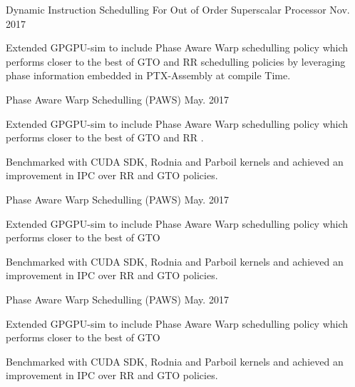 \begin{cvprojects}
    \cvproject
    {Dynamic Instruction Schedulling For Out of Order Superscalar Processor }
    {\color{darkgray}Nov. 2017}
    {
      \begin{cvprojectitems}
        \item {Extended GPGPU-sim to include Phase Aware Warp schedulling policy which performs closer to the best of GTO and RR schedulling policies by leveraging phase information embedded in PTX-Assembly at compile Time.}
      \end{cvprojectitems}
    }

    \cvproject
    {Phase Aware Warp Schedulling (PAWS) }
    {\color{darkgray}May. 2017}
    {
      \begin{cvprojectitems}
        \item {Extended GPGPU-sim to include Phase Aware Warp schedulling policy which performs closer to the best of GTO and RR .}
        \item {Benchmarked with CUDA SDK, Rodnia and Parboil kernels and achieved an improvement in IPC over RR and GTO policies.} 
      \end{cvprojectitems}
    }

    \cvproject
    {Phase Aware Warp Schedulling (PAWS) }
    {\color{darkgray}May. 2017}
    {
      \begin{cvprojectitems}
        \item {Extended GPGPU-sim to include Phase Aware Warp schedulling policy which performs closer to the best of GTO }
        \item {Benchmarked with CUDA SDK, Rodnia and Parboil kernels and achieved an improvement in IPC over RR and GTO policies.} 
      \end{cvprojectitems}
    }

     \cvproject
    {Phase Aware Warp Schedulling (PAWS) }
    {\color{darkgray}May. 2017}
    {
      \begin{cvprojectitems}
        \item {Extended GPGPU-sim to include Phase Aware Warp schedulling policy which performs closer to the best of GTO }
        \item {Benchmarked with CUDA SDK, Rodnia and Parboil kernels and achieved an improvement in IPC over RR and GTO policies.} 
      \end{cvprojectitems}
    }

\end{cvprojects}
